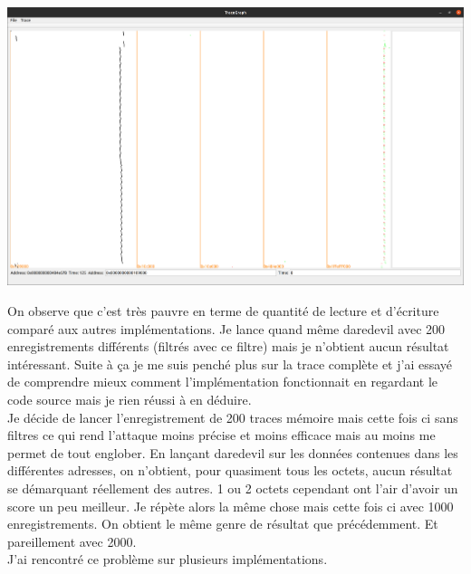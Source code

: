 \documentclass[10pt,a4paper]{article}
\begin{document}
\begin{center}
\includegraphics[scale=0.11]{Images/748_avec_filtre.png}\\
\end{center}
On observe que c'est très pauvre en terme de quantité de lecture et d'écriture comparé aux autres implémentations. Je lance quand même daredevil avec 200 enregistrements différents (filtrés avec ce filtre) mais je n'obtient aucun résultat intéressant. Suite à ça je me suis penché plus sur la trace complète et j'ai essayé de comprendre mieux comment l'implémentation fonctionnait en regardant le code source mais je rien réussi à en déduire.\\
Je décide de lancer l'enregistrement de 200 traces mémoire mais cette fois ci sans filtres ce qui rend l'attaque moins précise et moins efficace mais au moins me permet de tout englober. En lançant daredevil sur les données contenues dans les différentes adresses, on n'obtient, pour quasiment tous les octets, aucun résultat se démarquant réellement des autres. 1 ou 2 octets cependant ont l'air d'avoir un score un peu meilleur. Je répète alors la même chose mais cette fois ci avec 1000 enregistrements. On obtient le même genre de résultat que précédemment. Et pareillement avec 2000.\\
J'ai rencontré ce problème sur plusieurs implémentations.
\end{document}
